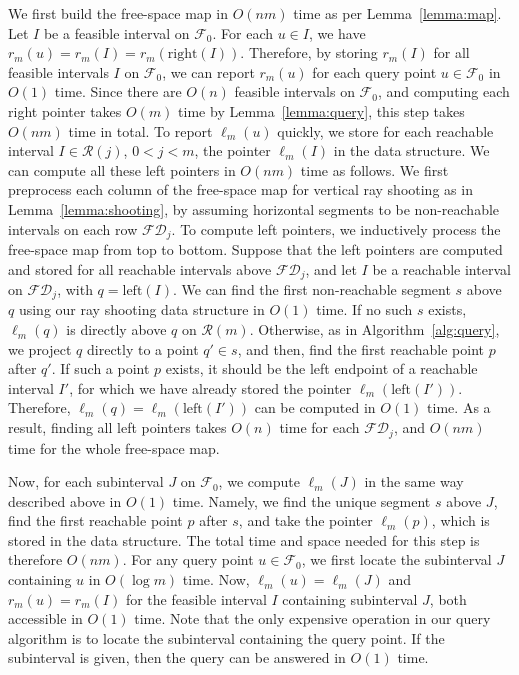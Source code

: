 \documentclass[12pt]{dalthesis}
\def\favoritefont{\bfseries \sffamily}
\def\QED{\ensuremath{{\Box}}}
\def\markatright#1{\leavevmode\unskip\nobreak\quad\hspace*{\fill}{#1}}
\newenvironment{proof}
	{\begin{trivlist}\item[\hskip\labelsep{\favoritefont Proof:}]}
	{\markatright{\QED}\end{trivlist}}
\newcommand{\qed}{}
\newcommand{\CF}{{\mathscr F}}
\newcommand{\CR}{{\mathscr R}}
\newcommand{\Left}{\mbox{left}}
\newcommand{\Right}{\mbox{right}}
\newcommand{\fs}{free-space }
\newcommand{\FD}{\mathscr {FD}}
\newcommand{\F}{\CF}
\newcommand{\R}{\CR}
\newcommand{\lp}{\ell}
\newcommand{\rp}{r}
\begin{document}
\begin{proof}
	We first build the \fs map in $O(nm)$ time as per Lemma~\ref{lemma:map}.
	Let $I$ be a feasible interval on $\F_0$.
	For each $u \in I$, we have $\rp_m(u) = \rp_m(I) = \rp_m(\Right(I))$.
	Therefore, by storing $\rp_m(I)$ for all feasible intervals $I$ on $\F_0$,
	we can report $\rp_m(u)$ for each query point $u \in \F_0$ in $O(1)$ time.
	Since there are $O(n)$ feasible intervals on $\F_0$,
	and computing each right pointer takes $O(m)$ time by Lemma~\ref{lemma:query},
	this step takes $O(nm)$ time in total.
	To report $\lp_m(u)$ quickly, we store for each reachable interval $I \in \R(j)$,
	$0 < j < m$, the pointer $\lp_m(I)$ in the data structure.
	We can compute all these left pointers in $O(nm)$ time as follows.
	We first preprocess each column of the \fs map
	for vertical ray shooting as in Lemma~\ref{lemma:shooting},
	by assuming horizontal segments 
	to be non-reachable intervals on each row $\FD_j$. 
	To compute left pointers, we inductively process 
	the \fs map from top to bottom.
	Suppose that the left pointers are computed and stored for 
	all reachable intervals above $\FD_j$,
	and let $I$ be a reachable interval on $\FD_j$,
	with $q = \Left(I)$.
	We can find the first non-reachable segment $s$
	above $q$ using our ray shooting data structure in $O(1)$ time.
	If no such $s$ exists, $\lp_m(q)$ is directly above $q$ on $\R(m)$.
	Otherwise, as in Algorithm~\ref{alg:query},
	we project $q$ directly to a point $q' \in s$, 
	and then, find the first reachable point $p$ after $q'$.
	If such a point $p$ exists, it should be the left endpoint of a reachable interval $I'$,
	for which we have already stored the pointer $\lp_m(\Left(I'))$.
	Therefore, $\lp_m(q) = \lp_m(\Left(I'))$ can be computed 
	in $O(1)$ time. As a result, finding all left pointers takes $O(n)$ time for each $\FD_j$,
	and $O(nm)$ time for the whole \fs map.
	

	Now, for each subinterval $J$ on $\F_0$,
	we compute $\lp_m(J)$ in the same way described above 
	in $O(1)$ time. Namely, we find the unique segment $s$ above $J$,
	find the first reachable point $p$ after $s$, 
	and take the pointer $\lp_m(p)$, which is stored in the data structure.
	The total time and space needed for this step is therefore $O(nm)$.
	For any query point $u \in \F_0$,
	we first locate the subinterval $J$ containing $u$ in $O(\log m)$ time.
	Now, $\lp_m(u) = \lp_m(J)$ and
	$\rp_m(u) = \rp_m(I)$ for the feasible interval $I$ containing subinterval $J$,
	both accessible in $O(1)$ time.
	Note that the only expensive operation in our query algorithm is
	to locate the subinterval containing the query point.
	If the subinterval is given, 
	then the query can be answered in $O(1)$ time.
	\qed
\end{proof}
\end{document}
